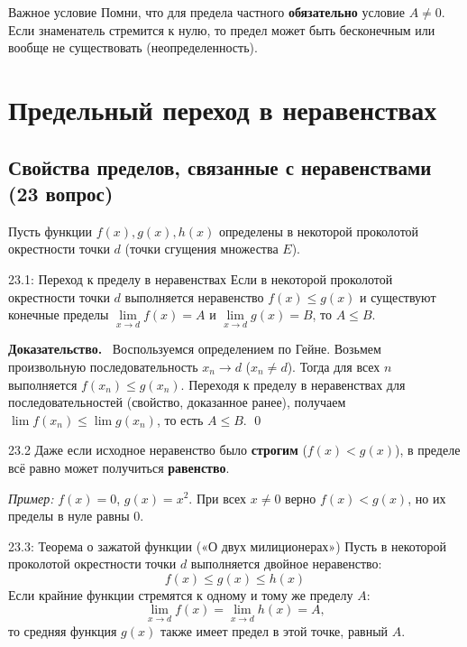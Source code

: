 \documentclass[a4paper,12pt]{article}
\newcommand{\myproof}{\textbf{Доказательство.}\ }
\begin{document}
	
	\vspace{0.5cm}
	\begin{importantbox}{Важное условие}
		Помни, что для предела частного \textbf{обязательно} условие $A \neq 0$. Если знаменатель стремится к нулю, то предел может быть бесконечным или вообще не существовать (неопределенность).
	\end{importantbox}
	
	
	
	
	
	
	\newpage
	\section{Предельный переход в неравенствах}
	
	\subsection{Свойства пределов, связанные с неравенствами (23 вопрос)}
	
	Пусть функции $f(x), g(x), h(x)$ определены в некоторой проколотой окрестности точки $d$ (точки сгущения множества $E$).
	
	\begin{theorembox}{23.1: Переход к пределу в неравенствах}
		Если в некоторой проколотой окрестности точки $d$ выполняется неравенство $f(x) \le g(x)$ и существуют конечные пределы $\lim\limits_{x \to d} f(x) = A$ и $\lim\limits_{x \to d} g(x) = B$, то $A \le B$.
	\end{theorembox}
	
	\vspace{0.5cm}
	\myproof
	Воспользуемся определением по Гейне. Возьмем произвольную последовательность $x_n \to d$ ($x_n \neq d$). Тогда для всех $n$ выполняется $f(x_n) \le g(x_n)$. Переходя к пределу в неравенствах для последовательностей (свойство, доказанное ранее), получаем $\lim f(x_n) \le \lim g(x_n)$, то есть $A \le B$. \qed
	
	
	\vspace{0.5cm}
	\begin{remarkbox}{23.2}
		Даже если исходное неравенство было \textbf{строгим} ($f(x) < g(x)$), в пределе всё равно может получиться \textbf{равенство}.
		
		\textit{Пример:} $f(x) = 0$, $g(x) = x^2$. При всех $x \neq 0$ верно $f(x) < g(x)$, но их пределы в нуле равны $0$.
	\end{remarkbox}
	
	\vspace{0.5cm}
	\begin{theorembox}{23.3: Теорема о зажатой функции («О двух милиционерах»)}
		Пусть в некоторой проколотой окрестности точки $d$ выполняется двойное неравенство:
		\[ f(x) \le g(x) \le h(x) \]
		Если крайние функции стремятся к одному и тому же пределу $A$:
		\[ \lim_{x \to d} f(x) = \lim_{x \to d} h(x) = A, \]
		то средняя функция $g(x)$ также имеет предел в этой точке, равный $A$.
	\end{theorembox}
	
\end{document}
